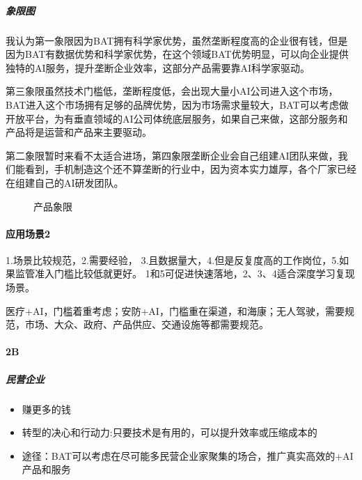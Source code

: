 \documentclass[letterpaper,10pt,english]{sphinxmanual}
\let\sphinxpxdimen\pdfpxdimen\else\newdimen\sphinxpxdimen
\begin{document}
\subparagraph{象限图}
\label{\detokenize{chapter_project/AI_industry_analysis:id21}}
我认为第一象限因为BAT拥有科学家优势，虽然垄断程度高的企业很有钱，但是因为BAT有数据优势和科学家优势，在这个领域BAT优势明显，可以向企业提供独特的AI服务，提升垄断企业效率，这部分产品需要靠AI科学家驱动。

第三象限虽然技术门槛低，垄断程度低，会出现大量小AI公司进入这个市场，BAT进入这个市场拥有足够的品牌优势，因为市场需求量较大，BAT可以考虑做开放平台，为有垂直领域的AI公司体统底层服务，如果自己来做，这部分服务和产品将是运营和产品来主要驱动。

第二象限暂时来看不太适合进场，第四象限垄断企业会自己组建AI团队来做，我们能看到，手机制造这个还不算垄断的行业中，因为资本实力雄厚，各个厂家已经在组建自己的AI研发团队。

\begin{figure}[H]
\centering
\capstart

\noindent\sphinxincludegraphics[width=600\sphinxpxdimen]{{产品象限}.png}
\caption{产品象限}\label{\detokenize{chapter_project/AI_industry_analysis:id31}}\end{figure}


\paragraph{应用场景2\sphinxfootnotemark[720]}
\label{\detokenize{chapter_project/AI_industry_analysis:id22}}%
\begin{footnotetext}[720]\sphinxAtStartFootnote
{}
%
\end{footnotetext}\ignorespaces 
1.场景比较规范，2.需要经验，
3.且数据量大，4.但是反复度高的工作岗位，5.如果监管准入门槛比较低就更好。
1和5可促进快速落地，2、3、4适合深度学习复现场景。

医疗+AI，门槛着重考虑；安防+AI，门槛重在渠道，和海康；无人驾驶，需要规范，市场、大众、政府、产品供应、交通设施等都需要规范。


\paragraph{2B}
\label{\detokenize{chapter_project/AI_industry_analysis:b}}

\subparagraph{民营企业}
\label{\detokenize{chapter_project/AI_industry_analysis:id23}}\begin{itemize}
\item {} 
赚更多的钱

\item {} 
转型的决心和行动力:只要技术是有用的，可以提升效率或压缩成本的

\item {} 
途径：BAT可以考虑在尽可能多民营企业家聚集的场合，推广真实高效的+AI产品和服务

\end{itemize}
\end{document}

